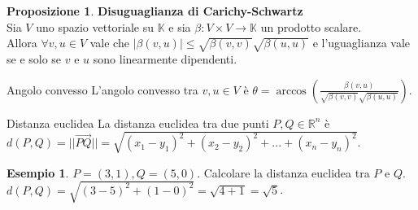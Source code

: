 \documentclass[a4paper]{article}
\theoremstyle{definition}
\newtheorem*{es}{Esempio}
\newtheorem*{prop}{Proposizione}
\begin{document}
	\begin{prop}
		\textbf{Disuguaglianza di Carichy-Schwartz} \\
		Sia $V$ uno spazio vettoriale su $\mathbb{K}$ e sia $\beta: V \times V \to \mathbb{K}$ un prodotto scalare. \\
		Allora $\forall v, u \in V$ vale che $|\beta(v, u)| \le \sqrt{\beta(v, v)}\sqrt{\beta(u, u)}$ e l'uguaglianza vale se e solo se $v$ e $u$ sono linearmente dipendenti.
	\end{prop}
	\begin{deff}{Angolo convesso}{}
		L'angolo convesso tra $v, u \in V$ è $\theta = \arccos\left(\frac{\beta(v, u)}{\sqrt{\beta(v, v)}\sqrt{\beta(u, u)}}\right)$.
	\end{deff}
	\begin{deff}{Distanza euclidea}{}
		La distanza euclidea tra due punti $P, Q \in \mathbb{R}^n$ è $d(P, Q) = ||\overrightarrow{PQ}|| = \sqrt{(x_1 - y_1)^2 + (x_2 - y_2)^2 + ... + (x_n - y_n)^2}$.
	\end{deff}
	\begin{es}
		$P = (3, 1), Q = (5, 0)$. Calcolare la distanza euclidea tra $P$ e $Q$. \\
		$d(P, Q) = \sqrt{(3 - 5)^2 + (1 - 0)^2} = \sqrt{4 + 1} = \sqrt{5}$.
	\end{es}
\end{document}
